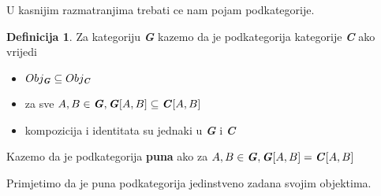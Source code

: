 \documentclass[11pt]{article}
\newcommand{\category}[1]{\textbf{\emph{#1}}}
\theoremstyle{definition}
\newtheorem{definition}{Definicija}
\begin{document}
  U kasnijim razmatranjima trebati ce nam pojam podkategorije.
  \begin{definition}
    Za kategoriju \category{G} kazemo da je podkategorija kategorije
    \category{C} ako vrijedi
    \begin{itemize}
      \item $Obj_\category{G} \subseteq Obj_\category{C}$
      \item za sve $A, B \in \category{G}, \category{G}[A, B] \subseteq
        \category{C}[A, B]$
      \item kompozicija i identitata su jednaki u \category{G} i \category{C}
    \end{itemize}
    Kazemo da je podkategorija \textbf{puna} ako za $A, B \in \category{G},
    \category{G}[A, B] = \category{C}[A, B]$
  \end{definition}
  Primjetimo da je puna podkategorija jedinstveno zadana svojim objektima.
  \newpage
\end{document}
